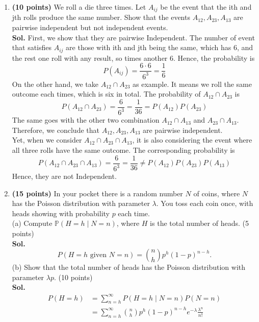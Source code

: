 \begin{enumerate}
    \item \textbf{(10 points)} We roll a die three times. Let \(A_{ij}\) be the event that the ith and jth rolls produce the same number.
    Show that the events \(A_{12}, A_{23}, A_{13}\) are pairwise independent but not independent events.
    \\
    \textbf{Sol.} First, we show that they are pairwise Independent. 
    The number of event that satisfies \(A_{ij} \) are those with ith and jth being the same, which has \(6\), and the rest one roll with any result, so times another \(6\). Hence, the probability is   
    \[
        P(A_{ij}) = \frac{6 \cdot 6}{6^3} = \frac{1}{6}
    \] 
    On the other hand, we take \(A_{12} \cap A_{23}\) as example. It means we roll the same outcome each times, which is six in total. The probability of \(A_{12} \cap A_{23} \) is  
    \[
        P(A_{12} \cap A_{23} ) = \frac{6}{6^3} = \frac{1}{36} = P(A_{12}) P(A_{23} )
    \]
    The same goes with the other two combination \(A_{12}\cap A_{13}  \) and \(A_{23} \cap A_{13} \).  
    Therefore, we conclude that \(A_{12}, A_{23} ,A_{13}  \) are pairwise independent. \\
    Yet, when we consider \(A_{12}\cap A_{23} \cap A_{13}  \), it is also considering the event where all three rolls have the same outcome. The corresponding probability is 
    \[
        P(A_{12} \cap A_{23} \cap A_{13} ) = \frac{6}{6^3} = \frac{1}{36} \neq P(A_{12} )P(A_{23} )P(A_{13} )
    \]
    Hence, they are not Independent. 
    \item \textbf{(15 points)} In your pocket there is a random number $N$ of coins, where $N$ has the Poisson distribution with parameter $\lambda$. You toss each coin once, with heads showing with probability $p$ each time.\\
    (a) Compute $\mathbb{P}(H=h\mid N=n)$, where $H$ is the total number of heads. (5 points) \\
    \textbf{Sol.}
    \begin{equation*}
    P(H=h \text{ given } N=n)=\binom{n}{h}p^h(1-p)^{n-h}.
    \end{equation*}
    (b) Show that the total number of heads has the Poisson distribution with parameter $\lambda p$. (10 points) \\
    \textbf{Sol.}
    \begin{equation*}
    \begin{aligned}
    P(H=h)&=\sum_{n=h}^\infty P(H=h\mid N=n)P(N=n) \\&
    =\sum_{n=h}^\infty 
    \binom{n}{h}p^h(1-p)^{n-h}e^{-\lambda}\frac{\lambda^n}{n!} \\&

\end{aligned}
\end{equation*}
\end{enumerate}

